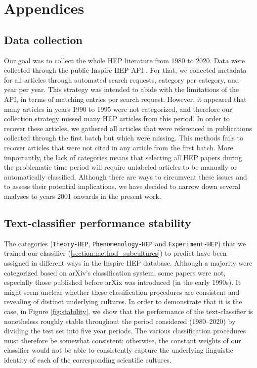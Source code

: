 \documentclass[smallextended]{svjour3}
\begin{document}
\appendix


\section{Appendices}
\label{section:appendix}

\subsection{Data collection}
\label{appendix:collection}

Our goal was to collect the whole HEP literature from 1980 to 2020. Data were collected through the public Inspire HEP API \citep{InspireAPI}. For that, we collected metadata for all articles through automated search requests, category per category, and year per year. This strategy was intended to abide with the limitations of the API, in terms of matching entries per search request. However, it appeared that many articles in years 1990 to 1995 were not categorized, and therefore our collection strategy missed many HEP articles from this period. In order to recover these articles, we gathered all articles that were referenced in publications collected through the first batch but which were missing. This methods fails to recover articles that were not cited in any article from the first batch. More importantly, 
the lack of categories means that selecting all HEP papers during the problematic time period will require unlabeled articles to be manually or automatically classified. Although there are ways to circumvent these issues and to assess their potential implications, we have decided to narrow down several analyses to years 2001 onwards in the present work.


\subsection{\label{appendix:stability}Text-classifier performance stability}

The categories (\texttt{Theory-HEP}, \texttt{Phenomenology-HEP} and \texttt{Experiment-HEP}) that we trained our classifier (\ref{section:method_subcultures}) to predict have been assigned in different ways in the Inspire HEP database. Although a majority were categorized based on arXiv's classification system, some papers were not, especially those published before arXix was introduced (in the early 1990s). It might seem unclear whether these classification procedures are consistent and revealing of distinct underlying cultures. In order to demonstrate that it is the case, in Figure \ref{fig:stability}, we show that the performance of the text-classifier is nonetheless roughly stable throughout the period considered (1980--2020) by dividing the test set into five year periods. The various classification procedures must therefore be somewhat consistent; otherwise, the constant weights of our classifier would not be able to consistently capture the underlying linguistic identity of each of the corresponding scientific cultures. 
\end{document}
